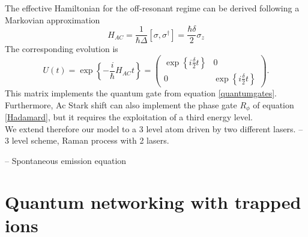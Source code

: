 The effective Hamiltonian for the off-resonant regime can be derived following a Markovian approximation \cite{acstarkhamiltonian}
\begin{equation}
H_{AC} = \frac{1}{\hbar \Delta} [\sigma,\sigma^\dagger] = \frac{\hbar \delta}{2}\sigma_z
\end{equation}
The corresponding evolution is
\begin{equation}
\label{acstarkrotation}
U(t) = \exp\left\{-\frac{i}{\hbar} H_{AC} t \right\} =
 \begin{pmatrix}
   \exp\left\{i\frac{\delta}{2}t\right\} & 0\\
   0 & \exp\left\{i\frac{\delta}{2}t\right\}
\end{pmatrix}.
\end{equation}
This matrix implements the quantum gate from equation \eqref{quantumgates}. Furthermore, Ac Stark shift can also implement the phase gate $R_{\phi}$ of equation \eqref{Hadamard}, but it requires the exploitation of a third energy level.\\
We extend therefore our model to a 3 level atom driven by two different lasers.
-- 3 level scheme, Raman process with 2 lasers.

-- Spontaneous emission equation

\section{Quantum networking with trapped ions}
